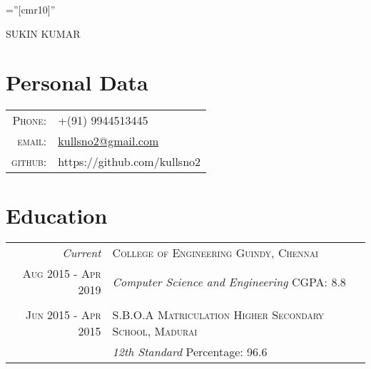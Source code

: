 \documentclass[a4paper,10pt]{article}
\begin{document}

\pagestyle{empty} %

\font\fb=''[cmr10]'' %

\par{\centering
		{\Huge SUKIN \textsc{KUMAR}
	}\bigskip\par}

\section{Personal Data}

\begin{tabular}{rl}
    \textsc{Phone:}     & +(91) 9944513445\\
    \textsc{email:}     &
    \href{mailto:kullsno2@gmail.com}{kullsno2@gmail.com}\\
    \textsc{github:}    & https://github.com/kullsno2
\end{tabular}

\section{Education}
\begin{tabular}{r|p{11cm}}
 \emph{Current} & \textsc{College of Engineering Guindy, Chennai}\\\textsc{Aug 2015 - Apr 2019}&\emph{Computer Science and Engineering} \qquad \qquad \qquad \qquad \quad \hspace*{\fill} CGPA: 8.8\\{} \multicolumn{2}{c}{} \\
 \textsc{Jun 2015 - Apr 2015} & \textsc{S.B.O.A Matriculation Higher Secondary School, Madurai}\\ &\emph{12th Standard}    \hfill Percentage: 96.6\multicolumn{2}{c}{}
\end{tabular}
\end{document}
